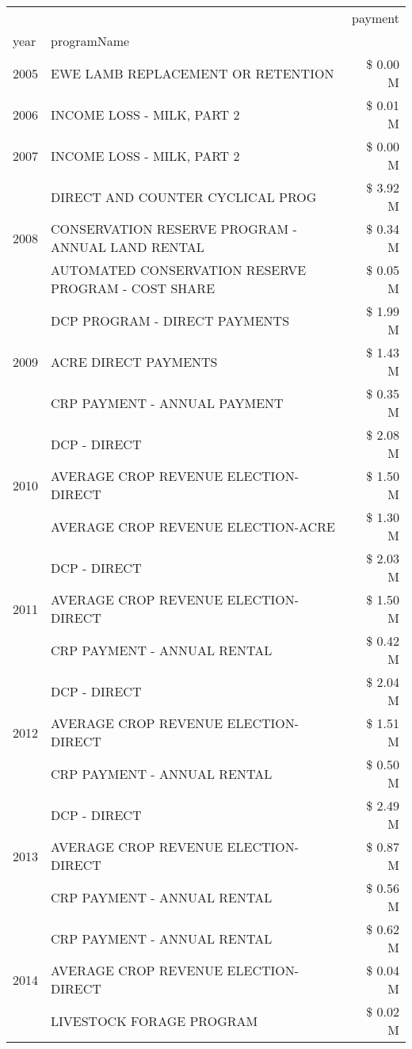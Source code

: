 \begin{tabular}{llr}
\toprule
 &  & payment \\
year & programName &  \\
\midrule
2005 & EWE LAMB REPLACEMENT OR RETENTION & \$ 0.00 M \\
\cline{1-3}
2006 & INCOME LOSS - MILK, PART 2 & \$ 0.01 M \\
\cline{1-3}
2007 & INCOME LOSS - MILK, PART 2 & \$ 0.00 M \\
\cline{1-3}
\multirow[t]{3}{*}{2008} & DIRECT AND COUNTER CYCLICAL PROG & \$ 3.92 M \\
 & CONSERVATION RESERVE PROGRAM - ANNUAL LAND RENTAL & \$ 0.34 M \\
 & AUTOMATED CONSERVATION RESERVE PROGRAM - COST SHARE & \$ 0.05 M \\
\cline{1-3}
\multirow[t]{3}{*}{2009} & DCP PROGRAM - DIRECT PAYMENTS & \$ 1.99 M \\
 & ACRE DIRECT PAYMENTS & \$ 1.43 M \\
 & CRP PAYMENT - ANNUAL PAYMENT & \$ 0.35 M \\
\cline{1-3}
\multirow[t]{3}{*}{2010} & DCP - DIRECT & \$ 2.08 M \\
 & AVERAGE CROP REVENUE ELECTION-DIRECT & \$ 1.50 M \\
 & AVERAGE CROP REVENUE ELECTION-ACRE & \$ 1.30 M \\
\cline{1-3}
\multirow[t]{3}{*}{2011} & DCP - DIRECT & \$ 2.03 M \\
 & AVERAGE CROP REVENUE ELECTION-DIRECT & \$ 1.50 M \\
 & CRP PAYMENT - ANNUAL RENTAL & \$ 0.42 M \\
\cline{1-3}
\multirow[t]{3}{*}{2012} & DCP - DIRECT & \$ 2.04 M \\
 & AVERAGE CROP REVENUE ELECTION-DIRECT & \$ 1.51 M \\
 & CRP PAYMENT - ANNUAL RENTAL & \$ 0.50 M \\
\cline{1-3}
\multirow[t]{3}{*}{2013} & DCP - DIRECT & \$ 2.49 M \\
 & AVERAGE CROP REVENUE ELECTION-DIRECT & \$ 0.87 M \\
 & CRP PAYMENT - ANNUAL RENTAL & \$ 0.56 M \\
\cline{1-3}
\multirow[t]{3}{*}{2014} & CRP PAYMENT - ANNUAL RENTAL & \$ 0.62 M \\
 & AVERAGE CROP REVENUE ELECTION-DIRECT & \$ 0.04 M \\
 & LIVESTOCK FORAGE PROGRAM & \$ 0.02 M \\
\cline{1-3}

\end{tabular}
